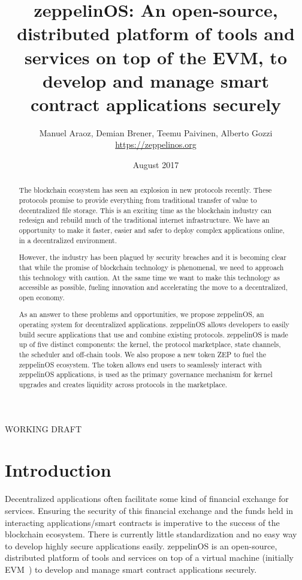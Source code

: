 \documentclass[]{article}
\title{
  zeppelinOS:
  An open-source, distributed platform of tools and services on top of the EVM,
  to develop and manage smart contract applications securely \bigskip
}
\author{
  Manuel Araoz, Demian Brener, Teemu Paivinen, Alberto Gozzi \smallskip\\
  \normalsize \url{https://zeppelinos.org} \medskip
}
\date{August 2017}
\makeatletter
\DeclareRobustCommand{\_}{%
  \leavevmode\vbox{%
    \hrule\@width.5em
          \@height-.26ex
          \@depth\dimexpr.26ex+.28pt\relax}}
\makeatother
\begin{document}
\maketitle

\begin{center}WORKING DRAFT\end{center}

  \bigskip

\begin{abstract}

The blockchain ecosystem has seen an explosion in new protocols
recently. These protocols promise to provide everything from traditional
transfer of value to decentralized file storage. This is an exciting
time as the blockchain industry can redesign and rebuild much of the
traditional internet infrastructure. We have an opportunity to make it
faster, easier and safer to deploy complex applications online, in a
decentralized environment.

However, the industry has been plagued by security breaches and it is
becoming clear that while the promise of blockchain technology is
phenomenal, we need to approach this technology with caution. At the
same time we want to make this technology as accessible as possible,
fueling innovation and accelerating the move to a decentralized, open
economy.

As an answer to these problems and opportunities, we propose
zeppelinOS, an operating system for decentralized applications.
zeppelinOS allows developers to easily build secure applications
that use and combine existing protocols. zeppelinOS is made up of five
distinct components: the kernel, the protocol marketplace, state
channels, the scheduler and off-chain tools. We also propose a new token
ZEP to fuel the zeppelinOS ecosystem. The token allows end users to
seamlessly interact with zeppelinOS applications, is used as the primary governance
mechanism for kernel upgrades and creates liquidity across protocols
in the marketplace.

\end{abstract}

\newpage

\tableofcontents

\newpage

\section{Introduction}

Decentralized applications often facilitate some kind of financial
exchange for services. Ensuring the security of this financial exchange
and the funds held in interacting applications/smart contracts is
imperative to the success of the blockchain ecosystem. There
is currently little standardization and no easy way to develop highly secure
applications easily. zeppelinOS is an open-source, distributed
platform of tools and services on top of a virtual machine (initially
EVM~\cite{evm}) to develop and manage smart contract applications securely.
\end{document}
